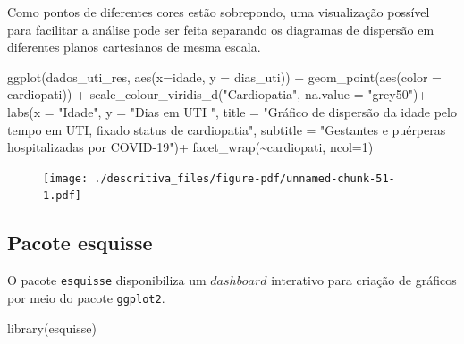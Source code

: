 \documentclass[
  letterpaper,
  DIV=11,
  numbers=noendperiod]{scrreprt}
\newenvironment{Shaded}{\begin{snugshade}}{\end{snugshade}}
\newcommand{\AttributeTok}[1]{\textcolor[rgb]{0.40,0.45,0.13}{#1}}
\newcommand{\DecValTok}[1]{\textcolor[rgb]{0.68,0.00,0.00}{#1}}
\newcommand{\FunctionTok}[1]{\textcolor[rgb]{0.28,0.35,0.67}{#1}}
\newcommand{\NormalTok}[1]{\textcolor[rgb]{0.00,0.23,0.31}{#1}}
\newcommand{\SpecialCharTok}[1]{\textcolor[rgb]{0.37,0.37,0.37}{#1}}
\newcommand{\StringTok}[1]{\textcolor[rgb]{0.13,0.47,0.30}{#1}}
\begin{document}
Como pontos de diferentes cores estão sobrepondo, uma visualização
possível para facilitar a análise pode ser feita separando os diagramas
de dispersão em diferentes planos cartesianos de mesma escala.

\begin{Shaded}
\begin{Highlighting}[]
\FunctionTok{ggplot}\NormalTok{(dados\_uti\_res, }\FunctionTok{aes}\NormalTok{(}\AttributeTok{x=}\NormalTok{idade, }\AttributeTok{y =}\NormalTok{ dias\_uti))  }\SpecialCharTok{+} 
  \FunctionTok{geom\_point}\NormalTok{(}\FunctionTok{aes}\NormalTok{(}\AttributeTok{color =}\NormalTok{ cardiopati)) }\SpecialCharTok{+}
  \FunctionTok{scale\_colour\_viridis\_d}\NormalTok{(}\StringTok{"Cardiopatia"}\NormalTok{, }\AttributeTok{na.value =} \StringTok{"grey50"}\NormalTok{)}\SpecialCharTok{+}
  \FunctionTok{labs}\NormalTok{(}\AttributeTok{x =} \StringTok{"Idade"}\NormalTok{, }\AttributeTok{y =} \StringTok{"Dias em UTI "}\NormalTok{, }\AttributeTok{title =} \StringTok{"Gráfico de dispersão da idade pelo tempo em UTI, fixado status de cardiopatia"}\NormalTok{, }\AttributeTok{subtitle =} \StringTok{"Gestantes e puérperas hospitalizadas por COVID{-}19"}\NormalTok{)}\SpecialCharTok{+}
  \FunctionTok{facet\_wrap}\NormalTok{(}\SpecialCharTok{\textasciitilde{}}\NormalTok{cardiopati, }\AttributeTok{ncol=}\DecValTok{1}\NormalTok{)}
\end{Highlighting}
\end{Shaded}

\begin{figure}[H]

{\centering \texttt{[image: ./descritiva\_files/figure-pdf/unnamed-chunk-51-1.pdf]}

}

\end{figure}

\hypertarget{pacote-esquisse}{%
\subsection{Pacote esquisse}\label{pacote-esquisse}}

O pacote \texttt{esquisse} disponibiliza um \(dashboard\) interativo
para criação de gráficos por meio do pacote \texttt{ggplot2}.

\begin{Shaded}
\begin{Highlighting}[]
\FunctionTok{library}\NormalTok{(esquisse)}
\end{Highlighting}
\end{Shaded}
\end{document}
